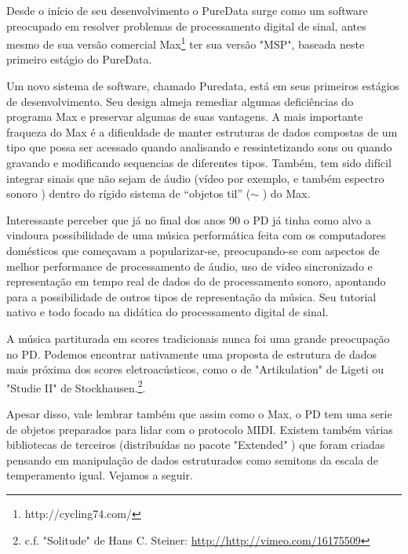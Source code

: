 \documentclass[
	12pt,				%
	openright,			%
	twoside,			%
	a4paper,			%
	english,			%
	french,				%
	spanish,			%
	brazil				%
	]{abntex2}
\begin{document}
Desde o início de seu desenvolvimento o PureData surge como um software preocupado em resolver problemas de processamento digital de sinal, antes mesmo de sua versão comercial Max\footnote{http://cycling74.com/} ter sua versão "MSP", baseada neste primeiro estágio do PureData. 

\begin{citacao}
Um novo sistema de software, chamado Puredata, está em seus primeiros estágios de desenvolvimento. Seu design almeja remediar algumas deficiências do programa Max e preservar algumas de suas vantagens. A mais importante fraqueza do Max é a dificuldade de manter estruturas de dados compostas de um tipo que possa ser acessado quando analisando e ressintetizando sons  ou quando gravando e modificando sequencias de diferentes tipos. Também, tem sido difícil integrar sinais que não sejam de áudio (vídeo por exemplo, e também espectro sonoro ) dentro do rígido sistema de “objetos til” ($\sim$ ) do Max.\cite{puckette1996pure}
\end{citacao}
 

Interessante perceber que já no final dos anos 90 o PD já tinha como alvo a vindoura possibilidade de uma música performática feita com os computadores domésticos que começavam a popularizar-se, preocupando-se com aspectos de melhor performance de processamento de áudio, uso de video sincronizado e representação em tempo real de dados do de processamento sonoro, apontando para a possibilidade de outros tipos de representação da música. Seu tutorial nativo e todo focado na didática do processamento digital de sinal.\cite{puckette2007theory}  


A música partiturada em scores tradicionais nunca foi uma grande preocupação no PD. Podemos encontrar nativamente uma proposta de estrutura de dados mais próxima dos scores eletroacústicos, como o de "Artikulation" de Ligeti ou "Studie II" de Stockhausen.\footnote{ c.f. "Solitude" de Hans C. Steiner:  \url{http://http://vimeo.com/16175509}}.


Apesar disso, vale lembrar também que assim como o Max, o PD tem uma serie de objetos preparados para lidar com o protocolo MIDI. Existem também várias bibliotecas de terceiros (distribuídas no pacote "Extended" ) que foram criadas pensando em manipulação de dados estruturados como semitons da escala de temperamento igual. Vejamos a seguir.
\end{document}
